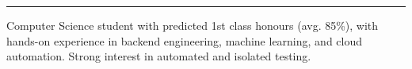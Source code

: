 \hrule
\vspace{6pt}
Computer Science student with predicted 1st class honours (avg. 85\%), with hands-on experience in backend engineering, machine learning, and cloud automation. Strong interest in automated and isolated testing.
\vspace{6pt}
